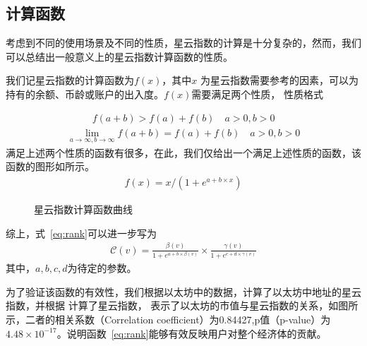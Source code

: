 \subsection*{计算函数}
考虑到不同的使用场景及不同的性质，星云指数的计算是十分复杂的，然而，我们可以总结出一般意义上的星云指数计算函数的性质。

我们记星云指数的计算函数为\(f(x)\)，其中\(x\)
为星云指数需要参考的因素，可以为持有的余额、币龄或账户的出入度。$f(x)$需要满足两个性质，{\color{red} 性质格式}

\begin{align}
f(a + b) > f(a) + f(b)\quad a>0, b>0
\end{align}
\begin{align}
\lim\limits_{a \to \infty, b\to \infty} f(a+b) = f(a) + f(b)\quad a>0, b>0
\end{align}
\noindent 满足上述两个性质的函数有很多，在此，我们仅给出一个满足上述性质的函数，该函数的图形如所示。
\begin{align}
f(x) = x/(1 + e^{a + b\times{}x})
\end{align}

\begin{figure}
\centering
{}
\caption{星云指数计算函数曲线}
\label{fig-nr}
\end{figure}

\vspace{2em}
综上，式~\ref{eq:rank}可以进一步写为
\begin{align}
\mathcal{C}(v) =  \frac{\beta(v)}{1+e^{a + b \times{} \beta(v)}} \times{} \frac{\gamma(v)}{1+e^{c + d \times{} \gamma(v)}}
\end{align}
\noindent 其中，$a, b, c, d$为待定的参数。

为了验证该函数的有效性，我们根据以太坊中的数据，计算了以太坊中地址的星云指数，并根据{\color{red} 计算了星云指数}，
表示了以太坊的市值与星云指数的关系，如图所示，二者的相关系数（Correlation coefficient）为0.84427,p值（p-value）为$4.48\times{}10^{-17}$。说明函数~\ref{eq:rank}能够有效反映用户对整个经济体的贡献。


